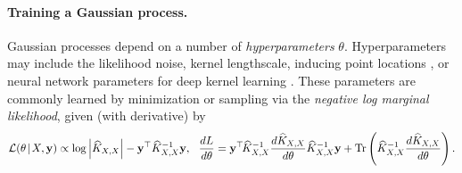 \paragraph{Training a Gaussian process.}
Gaussian processes depend on a number of \emph{hyperparameters} $\theta$. Hyperparameters may include the likelihood noise, kernel lengthscale, inducing point locations \cite{titsias2009variational}, or neural network parameters for deep kernel learning \cite{wilson2016deep}. These parameters are commonly learned by minimization or sampling via the \emph{negative log marginal likelihood}, given (with derivative) by
%
\begin{equation}
  \loglik (\theta \! \mid \! \bX, \by) \propto \log \left\vert \trainK \right\vert - \by^{\top}\trainK^{-1}\by,
  \:\:\:
  \frac{dL}{d\theta} = \by^{\top} \! \trainK^{-1}\frac{d\trainK}{d\theta}\trainK^{-1}\by + \tr{\trainK^{-1}\frac{d\trainK}{d\theta}} \label{eq:log_lik_and_deriv}.
\end{equation}
